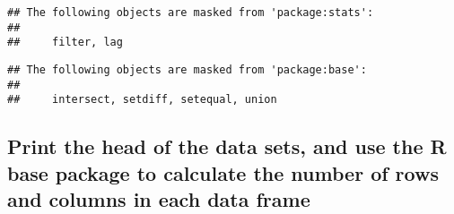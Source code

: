 \documentclass[
]{article}
\begin{document}
\begin{verbatim}
## The following objects are masked from 'package:stats':
## 
##     filter, lag
\end{verbatim}

\begin{verbatim}
## The following objects are masked from 'package:base':
## 
##     intersect, setdiff, setequal, union
\end{verbatim}

\hypertarget{print-the-head-of-the-data-sets-and-use-the-r-base-package-to-calculate-the-number-of-rows-and-columns-in-each-data-frame}{%
\subsection{Print the head of the data sets, and use the R base package
to calculate the number of rows and columns in each data
frame}\label{print-the-head-of-the-data-sets-and-use-the-r-base-package-to-calculate-the-number-of-rows-and-columns-in-each-data-frame}}
\end{document}
